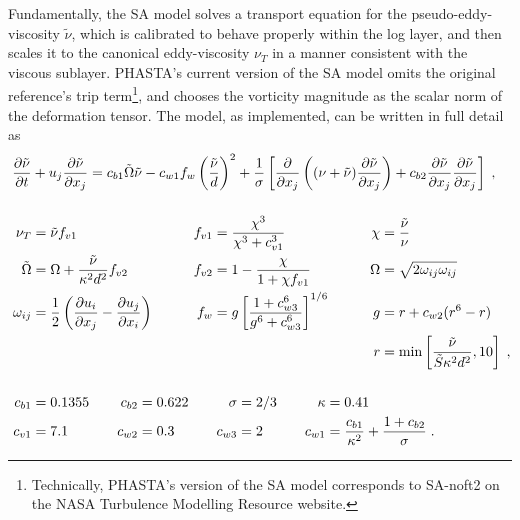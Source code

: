 \documentclass[11pt]{article}
\begin{document}
Fundamentally, the SA model solves a transport equation for the pseudo-eddy-viscosity $\tilde{\nu}$, which is calibrated to behave properly within the log layer, and then scales it to the canonical eddy-viscosity $\nu_T$ in a manner consistent with the viscous sublayer. PHASTA's current version of the SA model omits the original reference's trip term\footnote{Technically, PHASTA's version of the SA model corresponds to SA-noft2 on the NASA Turbulence Modelling Resource website.}, and chooses the vorticity magnitude as the scalar norm of the deformation tensor. The model, as implemented, can be written in full detail as
\begin{align}
	\phantom{W_{ij}}
	&\begin{aligned}
		\mathllap{\pp{\tilde{\nu}}{t}}
		&+ u_j \pp{\tilde{\nu}}{x_j}
		=
		c_{b1} \tilde{\Omega} \tilde{\nu}
		-
		c_{w1} f_w \left( \frac{\tilde{\nu}}{d} \right)^2
		+
		\frac{1}{\sigma} 
		\left[
		\pp{}{x_j}
			\left( (\nu + \tilde{\nu}) \pp{\tilde{\nu}}{x_j} \right)
			+ c_{b2} \pp{\tilde{\nu}}{x_j} \pp{\tilde{\nu}}{x_j}
		\right]
		\;,
		\label{eq:SA_transport}
	\end{aligned} \\[0.5cm]
	&\begin{aligned}
		\mathllap{\nu_T} &= \tilde{\nu} f_{v1}
		&\qquad
		f_{v1} &= \frac{\chi^3}{\chi^3 + c_{v1}^3}
		&\qquad
		\chi &= \frac{\tilde{\nu}}{\nu}
		\\
		\mathllap{\tilde{\Omega}} &= \Omega + \frac{\tilde{\nu}}{\kappa^2 d^2} f_{v2}
		&\qquad
		f_{v2} &= 1 - \frac{\chi}{1 + \chi f_{v1}}
		&\qquad
		\Omega &= \sqrt{2 \omega_{ij} \omega_{ij}}
		\\
		\mathllap{\omega_{ij}} &= \frac{1}{2} \left( \pp{u_i}{x_j} - \pp{u_j}{x_i} \right)
		&\qquad
		f_w &= g \left[ \frac{1 + c_{w3}^6}{g^6 + c_{w3}^6} \right]^{1/6}
		&\qquad
		g &= r + c_{w2}(r^6 - r)
		\\
		&&&&
		r &= \min \left[ \frac{\tilde{\nu}}{\tilde{S} \kappa^2 d^2}, 10 \right]
		\;,
		\label{eq:SA_definitions}
	\end{aligned} \\[0.5cm]
	&\begin{aligned}
		\mathllap{c_{b1}} &= 0.1355
		&\quad
		c_{b2} &= 0.622
		&\quad
		\sigma &= 2/3
		&\quad
		\kappa &= 0.41
		\\
		\mathllap{c_{v1}} &= 7.1
		&\quad
		c_{w2} &= 0.3
		&\quad
		c_{w3} &= 2
		&\quad
		c_{w1} &= \frac{c_{b1}}{\kappa^2} + \frac{1 + c_{b2}}{\sigma}
		\;.
		\label{eq:SA_constants}
	\end{aligned}
\end{align}
\end{document}
